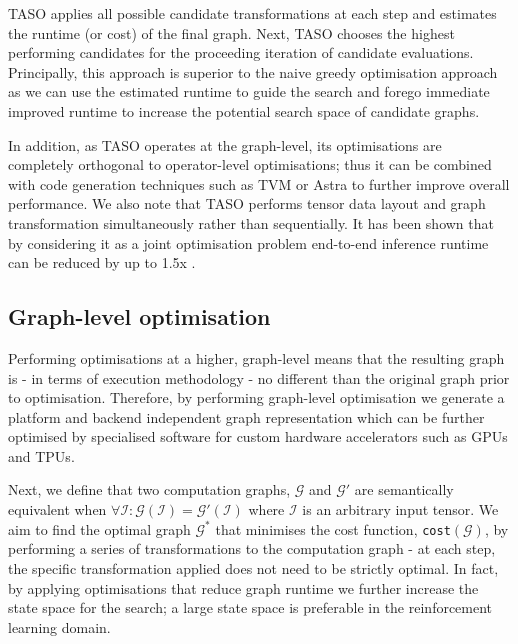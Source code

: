 TASO applies all possible candidate transformations at each step and estimates the runtime (or cost) of the final graph. Next, TASO chooses the highest performing candidates for the proceeding iteration of candidate evaluations. Principally, this approach is superior to the naive greedy optimisation approach as we can use the estimated runtime to guide the search and forego immediate improved runtime to increase the potential search space of candidate graphs.

In addition, as TASO operates at the graph-level, its optimisations are completely orthogonal to operator-level optimisations; thus it can be combined with code generation techniques such as TVM \cite{chen2018tvm} or Astra \cite{sivathanu2019astra} to further improve overall performance. We also note that TASO performs tensor data layout and graph transformation simultaneously rather than sequentially. It has been shown that by considering it as a joint optimisation problem end-to-end inference runtime can be reduced by up to 1.5x \cite{jia2019taso, jia2019optimizing}.


\subsection{Graph-level optimisation}

Performing optimisations at a higher, graph-level means that the resulting graph is - in terms of execution methodology - no different than the original graph prior to optimisation. Therefore, by performing graph-level optimisation we generate a platform and backend independent graph representation which can be further optimised by specialised software for custom hardware accelerators such as GPUs and TPUs.

Next, we define that two computation graphs, $\mathcal{G}$ and $\mathcal{G}'$ are semantically equivalent when $\forall \mathcal{I} : \mathcal{G}(\mathcal{I}) = \mathcal{G}'(\mathcal{I})$ where $\mathcal{I}$ is an arbitrary input tensor. We aim to find the optimal graph $\mathcal{G}^*$ that minimises the cost function, \texttt{cost}$(\mathcal{G})$, by performing a series of transformations to the computation graph - at each step, the specific transformation applied does not need to be strictly optimal. In fact, by applying optimisations that reduce graph runtime we further increase the state space for the search; a large state space is preferable in the reinforcement learning domain.

